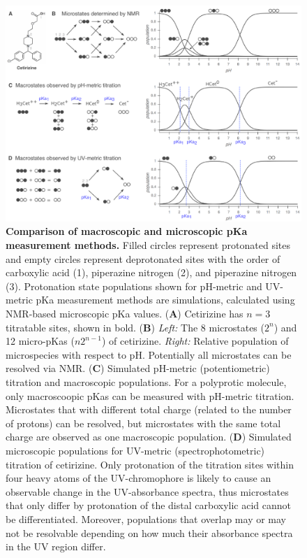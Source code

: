 \documentclass[9pt,lineno]{elife}
\begin{document}
\begin{figure}
\begin{center}
\includegraphics[width=1.00\linewidth]{figures/microscopic_vs_macroscopic_populations_figure.pdf}
\caption{{\bf Comparison of macroscopic and microscopic pKa measurement methods.}  
Filled circles represent protonated sites and empty circles represent deprotonated sites with the order of carboxylic acid (1), piperazine nitrogen (2), and piperazine nitrogen (3). 
Protonation state populations shown for pH-metric and UV-metric pKa measurement methods are simulations, calculated using NMR-based microscopic pKa values.
(\textbf{A}) Cetirizine has $n = $3 titratable sites, shown in bold. 
(\textbf{B}) \emph{Left:} The 8 microstates ($2^n$) and 12 micro-pKas ($n 2^{n-1}$) of cetirizine. 
\emph{Right:} Relative population of microspecies with respect to pH. 
Potentially all microstates can be resolved via NMR. 
(\textbf{C}) Simulated pH-metric (potentiometric) titration and macroscopic populations. 
For a polyprotic molecule, only macroscoopic pKas can be measured with pH-metric titration. 
Microstates that with different total charge (related to the number of protons) can be resolved, but microstates with the same total charge are observed as one macroscopic population. 
(\textbf{D}) Simulated microscopic populations for UV-metric (spectrophotometric) titration of cetirizine. 
Only protonation of the titration sites within four heavy atoms of the UV-chromophore is likely to cause an observable change in the UV-absorbance spectra, thus microstates that only differ by protonation of the distal carboxylic acid cannot be differentiated. 
Moreover, populations that overlap may or may not be resolvable depending on how much their absorbance spectra in the UV region differ. 
}
\end{center}
\end{figure}
\end{document}
